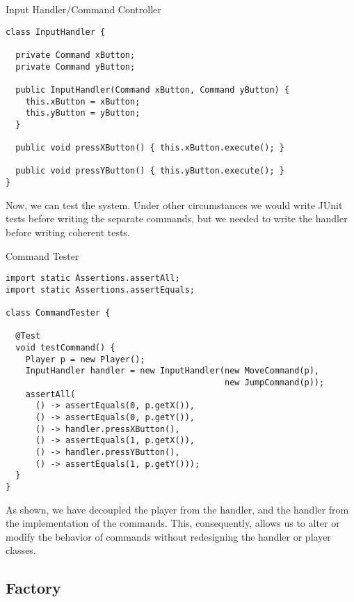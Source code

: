 \begin{cl}{Input Handler/Command Controller}
\begin{lstlisting}[language=MyJava]
class InputHandler {

  private Command xButton;
  private Command yButton;

  public InputHandler(Command xButton, Command yButton) {
    this.xButton = xButton;
    this.yButton = yButton;
  }

  public void pressXButton() { this.xButton.execute(); }

  public void pressYButton() { this.yButton.execute(); }
}
\end{lstlisting}
\end{cl}

Now, we can test the system. Under other circumstances we would write JUnit tests before writing the separate commands, but we needed to write the handler before writing coherent tests. 

\begin{cl}{Command Tester}
\begin{lstlisting}[language=MyJava]
import static Assertions.assertAll;
import static Assertions.assertEquals;

class CommandTester {

  @Test
  void testCommand() {
    Player p = new Player();
    InputHandler handler = new InputHandler(new MoveCommand(p), 
                                            new JumpCommand(p));
    assertAll(
      () -> assertEquals(0, p.getX()),
      () -> assertEquals(0, p.getY()),
      () -> handler.pressXButton(),
      () -> assertEquals(1, p.getX()),
      () -> handler.pressYButton(),
      () -> assertEquals(1, p.getY()));
  }
}
\end{lstlisting}
\end{cl}

As shown, we have decoupled the player from the handler, and the handler from the implementation of the commands. This, consequently, allows us to alter or modify the behavior of commands without redesigning the handler or player classes.

\subsection*{Factory}


